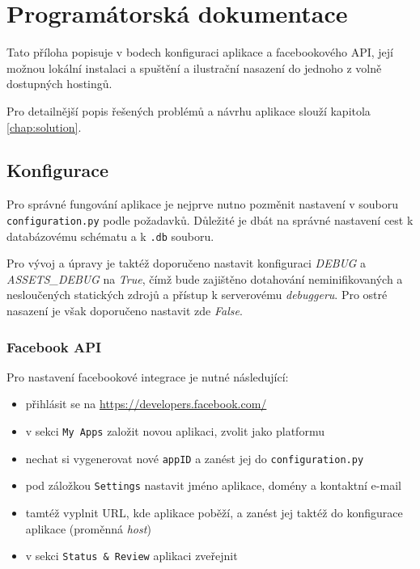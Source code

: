 \chapter{Programátorská dokumentace}

Tato příloha popisuje v bodech konfiguraci aplikace a facebookového API, její možnou lokální instalaci a spuštění a ilustrační nasazení do jednoho z volně dostupných hostingů.

Pro detailnější popis řešených problémů a návrhu aplikace slouží kapitola \ref{chap:solution}.

\section{Konfigurace}

Pro správné fungování aplikace je nejprve nutno pozměnit nastavení v souboru \verb|configuration.py| podle požadavků. Důležité je dbát na správné nastavení cest k databázovému schématu a k \verb|.db| souboru.

Pro vývoj a úpravy je taktéž doporučeno nastavit konfiguraci {\sl DEBUG} a \mbox{{\sl ASSETS\_DEBUG}} na {\sl True}, čímž bude zajištěno dotahování neminifikovaných a nesloučených statických zdrojů a přístup k serverovému {\sl debuggeru}. Pro ostré nasazení je však doporučeno nastavit zde {\sl False}.

\subsection{Facebook API}

Pro nastavení facebookové integrace je nutné následující:

\begin{itemize}
\item přihlásit se na \url{https://developers.facebook.com/}
\item v sekci \verb|My Apps| založit novou aplikaci, zvolit  jako platformu
\item nechat si vygenerovat nové \verb|appID| a zanést jej do \verb|configuration.py|
\item pod záložkou \verb|Settings| nastavit jméno aplikace, domény a kontaktní e-mail
\item tamtéž vyplnit URL, kde aplikace poběží, a zanést jej taktéž do konfigurace aplikace (proměnná {\sl host})
\item v sekci \verb|Status & Review| aplikaci zveřejnit
\end{itemize}

